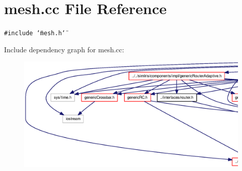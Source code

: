 \section{mesh.cc File Reference}
\label{mesh_8cc}
{\tt \#include \char`\"{}mesh.h\char`\"{}}\par


Include dependency graph for mesh.cc:\nopagebreak
\begin{figure}[H]
\begin{center}
\leavevmode
\includegraphics[width=420pt]{mesh_8cc__incl}
\end{center}
\end{figure}
